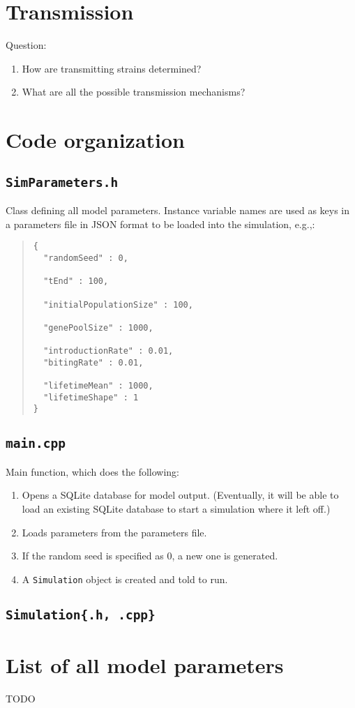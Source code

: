 \documentclass[11pt]{article}
\begin{document}
\section{Transmission}

Question:
\begin{enumerate}
	\item How are transmitting strains determined?
	\item What are all the possible transmission mechanisms?
\end{enumerate}


\section{Code organization}

\subsection{\texttt{SimParameters.h}}

Class defining all model parameters. Instance variable names are used as keys in a parameters file in JSON format to be loaded into the simulation, e.g.,:

\begin{quote}
\begin{verbatim}
{
  "randomSeed" : 0,
  
  "tEnd" : 100,
  
  "initialPopulationSize" : 100,
  
  "genePoolSize" : 1000,
  
  "introductionRate" : 0.01,
  "bitingRate" : 0.01,
  
  "lifetimeMean" : 1000,
  "lifetimeShape" : 1
}
\end{verbatim}
\end{quote}

\subsection{\texttt{main.cpp}}

Main function, which does the following:
\begin{enumerate}
	\item Opens a SQLite database for model output. (Eventually, it will be able to load an existing SQLite database to start a simulation where it left off.)
	\item Loads parameters from the parameters file.
	\item If the random seed is specified as 0, a new one is generated.
	\item A \texttt{Simulation} object is created and told to run.
\end{enumerate}

\subsection{\texttt{Simulation\{.h, .cpp\}}}

\section{List of all model parameters}

TODO
\end{document}

